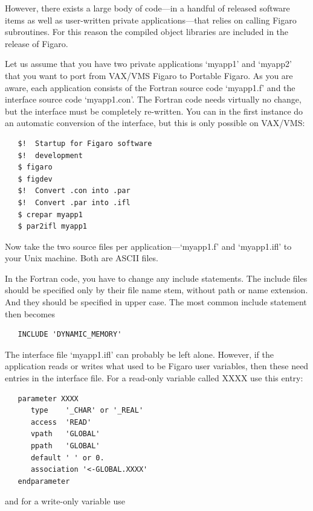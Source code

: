 \documentclass[11pt,twoside]{article}
\newcommand{\latorhtm}[2]{#1}
\newcommand{\latorhtm}[2]{#2}
\begin{document}
   However, there exists a large body of code\latorhtm{---}{-}in a
   handful of released
   software items as well as user-written private
   applications\latorhtm{---}{-}that
   relies on calling Figaro subroutines. For this reason the compiled
   object libraries are included in the release of Figaro.

   Let us assume that you have two private applications `myapp1' and
   `myapp2' that you want to port from VAX/VMS Figaro to Portable
   Figaro. As you are aware, each application consists of the
   Fortran source code `myapp1.f' and the interface source code
   `myapp1.con'. The Fortran code needs virtually no change, but the
   interface must be completely re-written. You can in the first
   instance do an automatic conversion of the interface, but this is
   only possible on VAX/VMS:

\begin{verbatim}
   $!  Startup for Figaro software
   $!  development
   $ figaro
   $ figdev
   $!  Convert .con into .par
   $!  Convert .par into .ifl
   $ crepar myapp1
   $ par2ifl myapp1
\end{verbatim}

   Now take the two source files per application\latorhtm{---}{-}`myapp1.f'
   and `myapp1.ifl' to your Unix machine. Both are ASCII files.

   In the Fortran code, you have to change any include statements. The
   include files should be specified only by their file name stem,
   without path or name extension. And they should be specified in upper
   case. The most common include statement then becomes

\begin{verbatim}
   INCLUDE 'DYNAMIC_MEMORY'
\end{verbatim}

   The interface file `myapp1.ifl' can probably be left alone.
   However, if the application reads or writes what used to be Figaro
   user variables, then these need entries in the interface file. For a
   read-only variable called XXXX use this entry:

\begin{verbatim}
   parameter XXXX
      type    '_CHAR' or '_REAL'
      access  'READ'
      vpath   'GLOBAL'
      ppath   'GLOBAL'
      default ' ' or 0.
      association '<-GLOBAL.XXXX'
   endparameter
\end{verbatim}

   and for a write-only variable use
\end{document}
